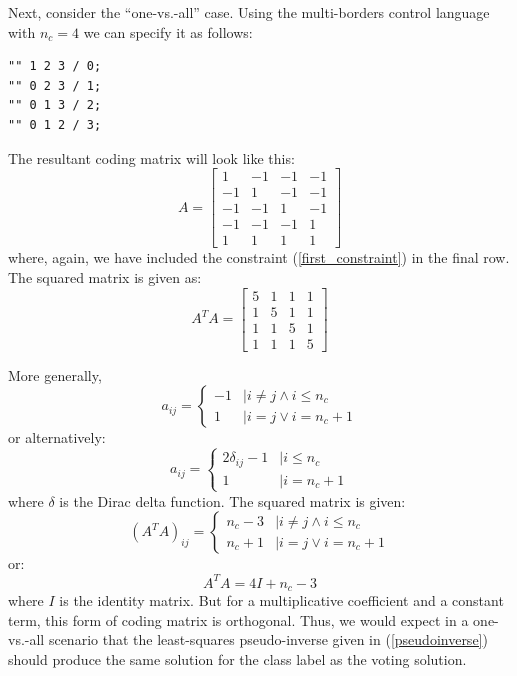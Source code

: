 \documentclass{article}
\begin{document}
Next, consider the ``one-vs.-all'' case.  
Using the multi-borders control language
\citep{Mills2014} with $n_c=4$ we can specify it as follows:
\begin{verbatim}
"" 1 2 3 / 0;
"" 0 2 3 / 1;
"" 0 1 3 / 2;
"" 0 1 2 / 3;
\end{verbatim}
The resultant coding matrix will look like this:
\begin{equation}
A = 
\begin{bmatrix}
1 & -1 & -1 & -1 \\
-1 & 1 & -1 & -1 \\
-1 & -1 & 1 & -1 \\
-1 & -1 & -1 & 1 \\
1 & 1 & 1 & 1
\end{bmatrix}
\end{equation}
where, again, we have included the constraint (\ref{first_constraint}) in
the final row.
The squared matrix is given as:
\begin{equation}
A^T A =
\begin{bmatrix}
5 & 1 & 1 & 1 \\
1 & 5 & 1 & 1 \\
1 & 1 & 5 & 1 \\
1 & 1 & 1 & 5 
\end{bmatrix}
\end{equation}

More generally,
\begin{equation}
a_{ij} = \left \lbrace 
\begin{array}{rl}
-1 & | i \ne j \land i \le n_c \\
1 & | i = j \lor i = n_c+1
\end{array}
\right .
\end{equation}
or alternatively:
\begin{equation}
a_{ij} = \left \lbrace 
\begin{array}{rl}
2 \delta_{ij} - 1 & | i \le n_c \\
1 & | i = n_c+1
\end{array}
\right .
\end{equation}
where $\delta$ is the Dirac delta function.
The squared matrix is given:
\begin{equation}
(A^T A)_{ij} = \left \lbrace
\begin{array}{rl}
n_c-3 & | i \ne j \land i \le n_c \\
n_c+1 & | i = j \lor i = n_c+1
\end{array}
\right .
\end{equation}
or:
\begin{equation}
A^T A = 4 I + n_c - 3
\end{equation}
where $I$ is the identity matrix.
But for a multiplicative coefficient and a constant term, this form of coding
matrix is orthogonal.
Thus, we would expect in a one-vs.-all scenario
that the least-squares pseudo-inverse given in 
(\ref{pseudoinverse}) should produce the same solution for the class label
as the voting solution.
\end{document}
